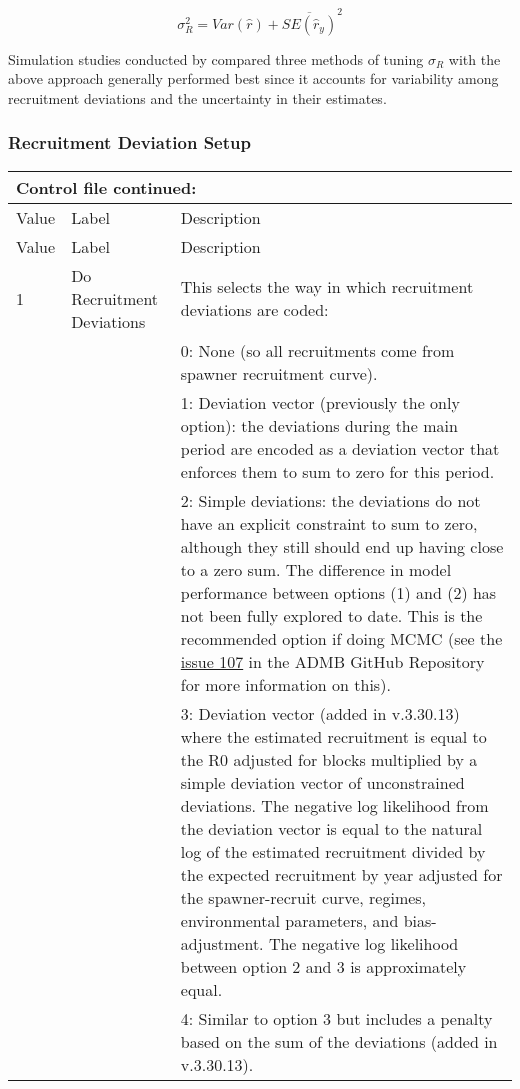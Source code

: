 \begin{equation}
	\sigma_R^2 = Var(\hat{r}) + \overline{SE(\hat{r}_y)}^2
\end{equation}

Simulation studies conducted by \cite{methot-adjusting-2011} compared three methods of tuning $\sigma_R$ with the above approach generally performed best since it accounts for variability among recruitment deviations and the uncertainty in their estimates.

\subsubsection{Recruitment Deviation Setup}
\begin{longtable}{p{1cm} p{3cm} p{11cm}}
	\multicolumn{3}{l}{Control file continued:} \\

	\hline
	Value & Label & Description \Tstrut\Bstrut\\
	\hline
	\endfirsthead

	\hline
	Value & Label & Description \Tstrut\Bstrut\\
	\hline
	\endhead
	\hline
	\endfoot
	\endlastfoot


	1 \Tstrut & Do Recruitment Deviations & This selects the way in which recruitment deviations are coded: \\
	  & & 0: None (so all recruitments come from spawner recruitment curve). \\
	  & & 1: Deviation vector (previously the only option): the deviations during the main period are encoded as a deviation vector that enforces them to sum to zero for this period. \\
	  & & 2: Simple deviations: the deviations do not have an explicit constraint to sum to zero, although they still should end up having close to a zero sum. The difference in model performance between options (1) and (2) has not been fully explored to date. This is the recommended option if doing MCMC (see the \href{https://github.com/admb-project/admb/issues/107}{issue 107} in the ADMB GitHub Repository for more information on this). \\
	  & & 3: Deviation vector (added in v.3.30.13) where the estimated recruitment is equal to the R0 adjusted for blocks multiplied by a simple deviation vector of unconstrained deviations. The negative log likelihood from the deviation vector is equal to the natural log of the estimated recruitment divided by the expected recruitment by year adjusted for the spawner-recruit curve, regimes, environmental parameters, and bias-adjustment. The negative log likelihood between option 2 and 3 is approximately equal. \\
	  & & 4: Similar to option 3 but includes a penalty based on the sum of the deviations (added in v.3.30.13). \\
	\hline


\end{longtable}
